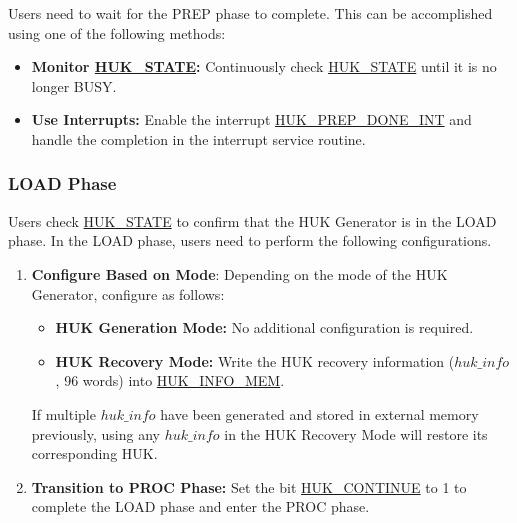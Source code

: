 \documentclass[main\_\_EN.tex]{subfiles}
\begin{document}
Users need to wait for the PREP phase to complete. This can be accomplished using one of the following methods:
\begin{itemize}
    \item \textbf{Monitor \hyperref[fielddesc:HUKSTATE]{HUK\_STATE}:} Continuously check \hyperref[fielddesc:HUKSTATE]{HUK\_STATE} until it is no longer BUSY.
    \item \textbf{Use Interrupts:} Enable the interrupt \hyperref[int:HUKPREPDONEINT]{HUK\_PREP\_DONE\_INT} and handle the completion in the interrupt service routine.
\end{itemize}


\subsubsection{LOAD Phase}

Users check \hyperref[fielddesc:HUKSTATE]{HUK\_STATE} to confirm that the HUK Generator is in the LOAD phase. In the LOAD phase, users need to perform the following configurations.
\begin{enumerate}
    \item \textbf{Configure Based on Mode}: Depending on the mode of the HUK Generator, configure as follows:
    \begin{itemize}
        \item \textbf{HUK Generation Mode:} No additional configuration is required.
        \item \textbf{HUK Recovery Mode:} Write the HUK recovery information (\hyperref[para:hukinfo]{\begin{math}huk\_info\end{math}}, 96 words) into \hyperref[mem:huk-info]{HUK\_INFO\_MEM}.
    \end{itemize}
    \vspace{-0.5em}
    \begin{tiplisting}
    If multiple \hyperref[para:hukinfo]{\begin{math}huk\_info\end{math}} have been generated and stored in external memory previously, using any \hyperref[para:hukinfo]{\begin{math}huk\_info\end{math}} in the HUK Recovery Mode will restore its corresponding HUK.
    \end{tiplisting}
    \item \textbf{Transition to PROC Phase:} Set the bit \hyperref[fielddesc:HUKCONTINUE]{HUK\_CONTINUE} to 1 to complete the LOAD phase and enter the PROC phase.
\end{enumerate}
\end{document}
